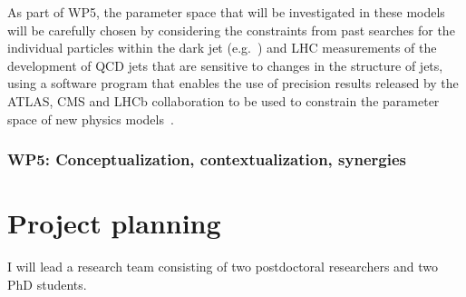\documentclass[11pt,a4paper]{article}
\begin{document}
As part of WP5, the parameter space that will be investigated in these models will be carefully chosen by considering the constraints from past searches for the individual particles within the dark jet (e.g.~\cite{DarkPion})  and LHC measurements of the development of QCD jets that are sensitive to changes in the structure of jets, using a software program that enables the use of precision results released by the ATLAS, CMS and LHCb collaboration to be used to constrain the parameter space of new physics models~\cite{CONTUR}. 

\subsubsection*{WP5: Conceptualization, contextualization, synergies}





\section{Project planning}
\smallskip

I will lead a research team consisting of two postdoctoral researchers and two PhD students. 


\end{document}
